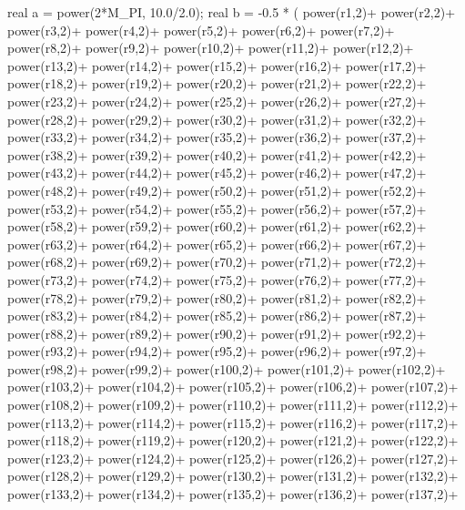 \begin{DoxyCode}
{
    real a = power(2*M_PI, 10.0/2.0);
    real b = -0.5 * (
        power(r1,2)+
    power(r2,2)+
    power(r3,2)+
    power(r4,2)+
    power(r5,2)+
    power(r6,2)+
    power(r7,2)+
    power(r8,2)+
    power(r9,2)+
    power(r10,2)+
    power(r11,2)+
    power(r12,2)+
    power(r13,2)+
    power(r14,2)+
    power(r15,2)+
    power(r16,2)+
    power(r17,2)+
    power(r18,2)+
    power(r19,2)+
    power(r20,2)+
    power(r21,2)+
    power(r22,2)+
    power(r23,2)+
    power(r24,2)+
    power(r25,2)+
    power(r26,2)+
    power(r27,2)+
    power(r28,2)+
    power(r29,2)+
    power(r30,2)+
    power(r31,2)+
    power(r32,2)+
    power(r33,2)+
    power(r34,2)+
    power(r35,2)+
    power(r36,2)+
    power(r37,2)+
    power(r38,2)+
    power(r39,2)+
    power(r40,2)+
    power(r41,2)+
    power(r42,2)+
    power(r43,2)+
    power(r44,2)+
    power(r45,2)+
    power(r46,2)+
    power(r47,2)+
    power(r48,2)+
    power(r49,2)+
    power(r50,2)+
    power(r51,2)+
    power(r52,2)+
    power(r53,2)+
    power(r54,2)+
    power(r55,2)+
    power(r56,2)+
    power(r57,2)+
    power(r58,2)+
    power(r59,2)+
    power(r60,2)+
    power(r61,2)+
    power(r62,2)+
    power(r63,2)+
    power(r64,2)+
    power(r65,2)+
    power(r66,2)+
    power(r67,2)+
    power(r68,2)+
    power(r69,2)+
    power(r70,2)+
    power(r71,2)+
    power(r72,2)+
    power(r73,2)+
    power(r74,2)+
    power(r75,2)+
    power(r76,2)+
    power(r77,2)+
    power(r78,2)+
    power(r79,2)+
    power(r80,2)+
    power(r81,2)+
    power(r82,2)+
    power(r83,2)+
    power(r84,2)+
    power(r85,2)+
    power(r86,2)+
    power(r87,2)+
    power(r88,2)+
    power(r89,2)+
    power(r90,2)+
    power(r91,2)+
    power(r92,2)+
    power(r93,2)+
    power(r94,2)+
    power(r95,2)+
    power(r96,2)+
    power(r97,2)+
    power(r98,2)+
    power(r99,2)+
    power(r100,2)+
    power(r101,2)+
    power(r102,2)+
    power(r103,2)+
    power(r104,2)+
    power(r105,2)+
    power(r106,2)+
    power(r107,2)+
    power(r108,2)+
    power(r109,2)+
    power(r110,2)+
    power(r111,2)+
    power(r112,2)+
    power(r113,2)+
    power(r114,2)+
    power(r115,2)+
    power(r116,2)+
    power(r117,2)+
    power(r118,2)+
    power(r119,2)+
    power(r120,2)+
    power(r121,2)+
    power(r122,2)+
    power(r123,2)+
    power(r124,2)+
    power(r125,2)+
    power(r126,2)+
    power(r127,2)+
    power(r128,2)+
    power(r129,2)+
    power(r130,2)+
    power(r131,2)+
    power(r132,2)+
    power(r133,2)+
    power(r134,2)+
    power(r135,2)+
    power(r136,2)+
    power(r137,2)+
}
\end{DoxyCode}
